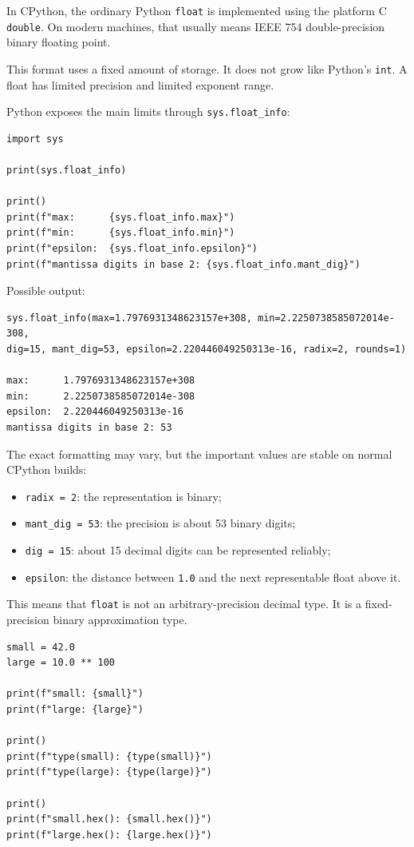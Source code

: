 In CPython, the ordinary Python \texttt{float} is implemented using the platform C \texttt{double}. On modern machines, that usually means IEEE 754 double-precision binary floating point.

This format uses a fixed amount of storage. It does not grow like Python's \texttt{int}. A float has limited precision and limited exponent range.

Python exposes the main limits through \texttt{sys.float\_info}:

\begin{verbatim}
import sys

print(sys.float_info)

print()
print(f"max:      {sys.float_info.max}")
print(f"min:      {sys.float_info.min}")
print(f"epsilon:  {sys.float_info.epsilon}")
print(f"mantissa digits in base 2: {sys.float_info.mant_dig}")
\end{verbatim}

Possible output:

\begin{verbatim}
sys.float_info(max=1.7976931348623157e+308, min=2.2250738585072014e-308, 
dig=15, mant_dig=53, epsilon=2.220446049250313e-16, radix=2, rounds=1)

max:      1.7976931348623157e+308
min:      2.2250738585072014e-308
epsilon:  2.220446049250313e-16
mantissa digits in base 2: 53
\end{verbatim}

The exact formatting may vary, but the important values are stable on normal CPython builds:

\begin{itemize}
    \item \texttt{radix = 2}: the representation is binary;
    \item \texttt{mant\_dig = 53}: the precision is about 53 binary digits;
    \item \texttt{dig = 15}: about 15 decimal digits can be represented reliably;
    \item \texttt{epsilon}: the distance between \texttt{1.0} and the next representable float above it.
\end{itemize}

This means that \texttt{float} is not an arbitrary-precision decimal type. It is a fixed-precision binary approximation type.

\begin{verbatim}
small = 42.0
large = 10.0 ** 100

print(f"small: {small}")
print(f"large: {large}")

print()
print(f"type(small): {type(small)}")
print(f"type(large): {type(large)}")

print()
print(f"small.hex(): {small.hex()}")
print(f"large.hex(): {large.hex()}")
\end{verbatim}

